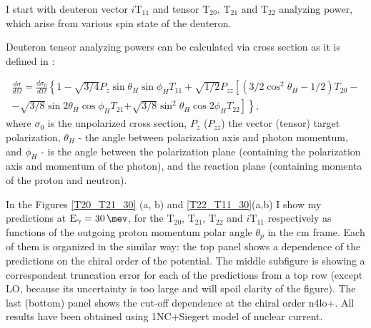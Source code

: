     I start with deuteron vector $i\text{T}_{11}$ and tensor $\text{T}_{20}$, $\text{T}_{21}$ and $\text{T}_{22}$
    analyzing power, which arise from various spin state of the deuteron.
    
    Deuteron tensor analyzing powers can be calculated via cross section as it is defined in \cite{rachek2007}:
    
    \begin{eqnarray}
            \frac{d \sigma}{d \Omega}= \frac{d \sigma_0}{d \Omega}\left\{1-\sqrt{3 / 4} P_z \sin \theta_H \sin \phi_H T_{11}\right.
            +\sqrt{1 / 2} P_{z z}\left[\left(3 / 2 \cos ^2 \theta_H-1 / 2\right) T_{20}\right. - \nonumber \\
            -\sqrt{3 / 8} \sin 2 \theta_H \cos \phi_H T_{21} 
            \left.\left.+\sqrt{3 / 8} \sin ^2 \theta_H \cos 2 \phi_H T_{22}\right]\right\},
    \end{eqnarray}
    where $\sigma_0$ is the unpolarized cross section, $P_z$ ($P_{zz}$)
    the vector (tensor) target polarization, $\theta_H$ - the angle
    between polarization axis and photon momentum,
    and $\phi_H$ - is the angle between the polarization plane 
    (containing the polarization axis and momentum of the photon),
    and the reaction plane (containing momenta of the proton
    and neutron).

    In the Figures \ref{T20_T21_30} (a, b) and \ref{T22_T11_30}(a,b)
    I show my predictions at $\text{E}_\gamma = \SI{30}{\mev}$, for the
    $\text{T}_{20}$, $\text{T}_{21}$, $\text{T}_{22}$  and $i\text{T}_{11}$ respectively as functions 
    of the outgoing proton momentum polar angle $\theta_p$ in the \gls{cm} frame. Each of them
    is organized in the similar way: the top
    panel shows a dependence of the predictions on the 
    chiral order of the potential. The middle subfigure is
    showing a correspondent truncation error for each of the 
    predictions from a top row (except LO, because its uncertainty is
    too large and will spoil clarity of the figure). The last (bottom)
    panel shows the cut-off dependence at the chiral
    order \gls{n4lo+}. 
    All results have been obtained using 1NC+Siegert model of nuclear current.

